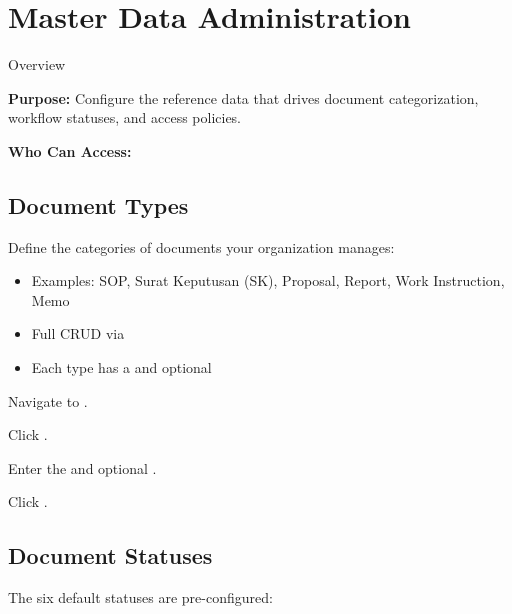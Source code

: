 \section{Master Data Administration}

\begin{ugModule}{Overview}

  \textbf{Purpose:}
  Configure the reference data that drives document
  categorization, workflow statuses, and access policies.

  \textbf{Who Can Access:}
\end{ugModule}

\subsection{Document Types}

Define the categories of documents your organization manages:

\begin{itemize}[leftmargin=18pt]
  \item Examples: SOP, Surat Keputusan (SK), Proposal,
    Report, Work Instruction, Memo
  \item Full CRUD via 
  \item Each type has a  and optional
\end{itemize}

\begin{ugSteps}
  \item Navigate to .
  \item Click .
  \item Enter the  and optional
        .
  \item Click .
\end{ugSteps}

\subsection{Document Statuses}

The six default statuses are pre-configured:

\begin{center}
  \quad
  \quad
  \quad
  \quad
  \quad
\end{center}

